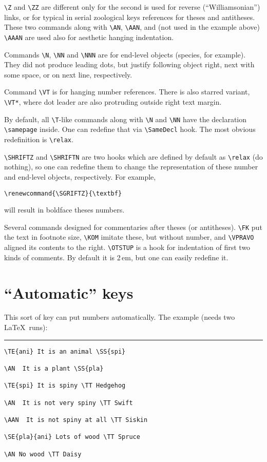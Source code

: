 \documentclass{article}
\begin{document}
\verb|\Z| and \verb|\ZZ| are different only for the second is used for reverse (``Williamsonian'') links, or for typical in serial zoological keys references for theses and antitheses. These two commands along with \verb|\AN|, \verb|\AAN|, and (not used in the example above) \verb|\AAAN| are used also for aesthetic hanging indentation.

Commands \verb|\N|, \verb|\NN| and \verb|\NNN| are for end-level objects (species, for example). They did not produce leading dots, but justify following object right, next with some space, or on next line, respectively.

Command \verb|\VT| is for hanging number references. There is also starred variant, \verb|\VT*|, where dot leader are also protruding outside right text margin.

By default, all \verb|\T|-like commands along with \verb|\N| and \verb|\NN| have the declaration \verb|\samepage| inside. One can redefine that via \verb|\SameDecl| hook. The most obvious redefinition is \verb|\relax|.

\verb|\SHRIFTZ| and \verb|\SHRIFTN| are two hooks which are defined by default as \verb|\relax| (do nothing), so one can redefine them to change the representation of these number and end-level objects, respectively. For example, 

\verb|\renewcommand{\SGRIFTZ}{\textbf}| 

will result in boldface theses numbers.

Several commands designed for commentaries after theses (or antitheses). \verb|\FK| put the text in footnote size, \verb|\KOM| imitate these, but without number, and \verb|\VPRAVO| aligned its contents to the right. \verb|\OTSTUP| is a hook for indentation of first two kinds of comments. By default it is 2\,em, but one can easily redefine it.

\section{``Automatic'' keys}

This sort of key can put numbers automatically. The example (needs two \LaTeX\ runs):

\bigskip\hrule

\begin{verbatim}
\TE{ani} It is an animal \SS{spi}

\AN  It is a plant \SS{pla}

\TE{spi} It is spiny \TT Hedgehog

\AN  It is not very spiny \TT Swift

\AAN  It is not spiny at all \TT Siskin

\SE{pla}{ani} Lots of wood \TT Spruce

\AN No wood \TT Daisy
\end{verbatim}
\end{document}
